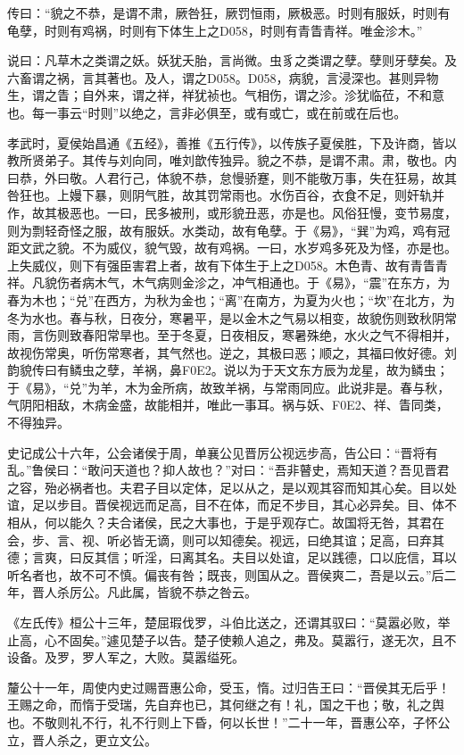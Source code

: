 \documentclass[]{article}
\begin{document}
传曰：``貌之不恭，是谓不肃，厥咎狂，厥罚恒雨，厥极恶。时则有服妖，时则有龟孽，时则有鸡祸，时则有下体生上之D058，时则有青眚青祥。唯金沴木。''

说曰：凡草木之类谓之妖。妖犹夭胎，言尚微。虫豸之类谓之孽。孽则牙孽矣。及六畜谓之祸，言其著也。及人，谓之D058。D058，病貌，言浸深也。甚则异物生，谓之眚；自外来，谓之祥，祥犹祯也。气相伤，谓之沴。沴犹临莅，不和意也。每一事云``时则''以绝之，言非必俱至，或有或亡，或在前或在后也。

孝武时，夏侯始昌通《五经》，善推《五行传》，以传族子夏侯胜，下及许商，皆以教所贤弟子。其传与刘向同，唯刘歆传独异。貌之不恭，是谓不肃。肃，敬也。内曰恭，外曰敬。人君行己，体貌不恭，怠慢骄蹇，则不能敬万事，失在狂易，故其咎狂也。上嫚下暴，则阴气胜，故其罚常雨也。水伤百谷，衣食不足，则奸轨并作，故其极恶也。一曰，民多被刑，或形貌丑恶，亦是也。风俗狂慢，变节易度，则为剽轻奇怪之服，故有服妖。水类动，故有龟孽。于《易》，``巽''为鸡，鸡有冠距文武之貌。不为威仪，貌气毁，故有鸡祸。一曰，水岁鸡多死及为怪，亦是也。上失威仪，则下有强臣害君上者，故有下体生于上之D058。木色青、故有青眚青祥。凡貌伤者病木气，木气病则金沴之，冲气相通也。于《易》，``震''在东方，为春为木也；``兑''在西方，为秋为金也；``离''在南方，为夏为火也；``坎''在北方，为冬为水也。春与秋，日夜分，寒暑平，是以金木之气易以相变，故貌伤则致秋阴常雨，言伤则致春阳常旱也。至于冬夏，日夜相反，寒暑殊绝，水火之气不得相并，故视伤常奥，听伤常寒者，其气然也。逆之，其极曰恶；顺之，其福曰攸好德。刘韵貌传曰有鳞虫之孽，羊祸，鼻F0E2。说以为于天文东方辰为龙星，故为鳞虫；于《易》，``兑''为羊，木为金所病，故致羊祸，与常雨同应。此说非是。春与秋，气阴阳相敌，木病金盛，故能相并，唯此一事耳。祸与妖、F0E2、祥、眚同类，不得独异。

史记成公十六年，公会诸侯于周，单襄公见晋厉公视远步高，告公曰：``晋将有乱。''鲁侯曰：``敢问天道也？抑人故也？''对曰：``吾非瞽史，焉知天道？吾见晋君之容，殆必祸者也。夫君子目以定体，足以从之，是以观其容而知其心矣。目以处谊，足以步目。晋侯视远而足高，目不在体，而足不步目，其心必异矣。目、体不相从，何以能久？夫合诸侯，民之大事也，于是乎观存亡。故国将无咎，其君在会，步、言、视、听必皆无谪，则可以知德矣。视远，曰绝其谊；足高，曰弃其德；言爽，曰反其信；听淫，曰离其名。夫目以处谊，足以践德，口以庇信，耳以听名者也，故不可不慎。偏丧有咎；既丧，则国从之。晋侯爽二，吾是以云。''后二年，晋人杀厉公。凡此属，皆貌不恭之咎云。

《左氏传》桓公十三年，楚屈瑕伐罗，斗伯比送之，还谓其驭曰：``莫嚣必败，举止高，心不固矣。''遽见楚子以告。楚子使赖人追之，弗及。莫嚣行，遂无次，且不设备。及罗，罗人军之，大败。莫嚣缢死。

釐公十一年，周使内史过赐晋惠公命，受玉，惰。过归告王曰：``晋侯其无后乎！王赐之命，而惰于受瑞，先自弃也已，其何继之有！礼，国之干也；敬，礼之舆也。不敬则礼不行，礼不行则上下昏，何以长世！''二十一年，晋惠公卒，子怀公立，晋人杀之，更立文公。
\end{document}
